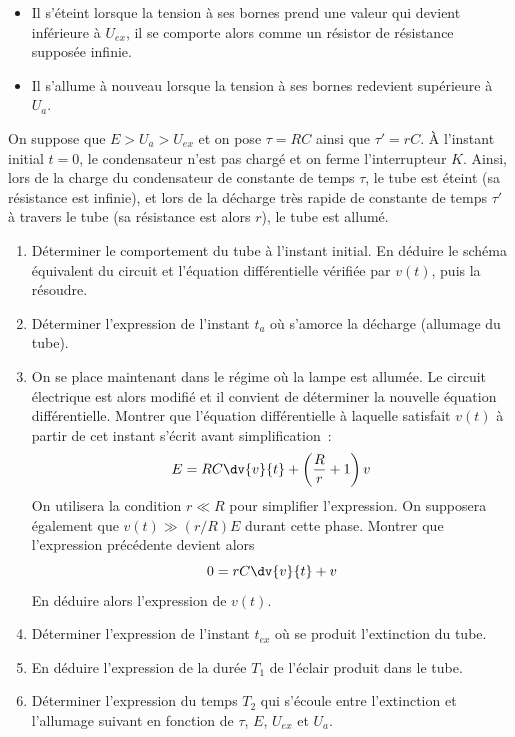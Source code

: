 \documentclass[a4paper, 10pt, garamond, oneside]{book}
\begin{document}
{\begin{itemize}
		      résistance $r \ll R$.
		\item Il s'éteint lorsque la tension à ses bornes prend une valeur qui
		      devient inférieure à $U_{ex}$, il se comporte alors comme un résistor de
		      résistance supposée infinie.
		\item Il s'allume à nouveau lorsque la tension à ses bornes redevient
		      supérieure à $U_{a}$.
	\end{itemize}
	On suppose que $E > U_{a}  > U_{ex}$ et on pose $\tau = RC$ ainsi que
	$\tau' = rC$. À l'instant initial $t = 0$, le condensateur n'est pas chargé
	et on ferme l'interrupteur $K$.
	\bigbreak
	Ainsi, lors de la charge du condensateur de constante de temps $\tau$,
	le tube est éteint (sa résistance est infinie), et lors de la décharge
	très rapide de constante de temps $\tau'$ à travers le tube (sa
	résistance est alors $r$), le tube est allumé.
	\begin{enumerate}
		\item Déterminer le comportement du tube à l'instant initial.
		      En déduire le schéma équivalent du circuit et l'équation
		      différentielle vérifiée par $v(t)$, puis la résoudre.
		\item Déterminer l'expression de l'instant $t_{a}$ où s'amorce la décharge
		      (allumage du tube).
		\item On se place maintenant dans le régime où la lampe est allumée.
		      Le circuit électrique est alors modifié et il convient de déterminer
		      la nouvelle équation différentielle. Montrer que l'équation
		      différentielle à laquelle satisfait $v(t)$ à partir de cet instant
		      s'écrit avant simplification~:
		      \[
			      E = RC \dv{v}{t} + \left(\frac{R}{r}+1\right) v
		      \]
		      \noindent
		      On utilisera la condition $r \ll R$ pour simplifier l'expression. On
		      supposera également que $v(t) \gg (r/R)E$ durant cette phase. Montrer
		      que l'expression précédente devient alors
		      \[
			      0 = rC \dv{v}{t} + v
		      \]
		      \noindent
		      En déduire alors l'expression de $v(t)$.
		\item Déterminer l'expression de l'instant $t_{ex}$ où se produit
		      l'extinction du tube.
		\item En déduire l'expression de la durée $T_1$ de l'éclair produit dans le
		      tube.
		\item Déterminer l'expression du temps $T_2$ qui s'écoule entre l'extinction
		      et l'allumage suivant en fonction de $\tau$, $E$, $U_{ex}$  et $U_{a}$.

\end{enumerate}}
\end{document}
